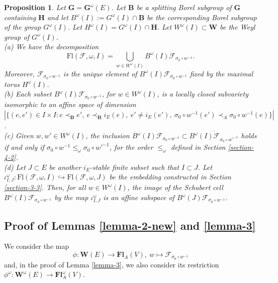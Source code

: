 \documentclass[12pt]{amsart}
\newtheorem{proposition}{Proposition}
\theoremstyle{definition}
\begin{document}
\begin{proposition}
\label{proposition-12-new}
Let $\mathbf{G}=\mathbf{G}^\omega(E)$. Let $\mathbf{B}$ be a splitting Borel subgroup of $\mathbf{G}$ containing $\mathbf{H}$ and let $B^\omega(I):=G^\omega(I)\cap\mathbf{B}$ be the corresponding Borel subgroup of the group $G^\omega(I)$. Let $H^\omega(I)=G^\omega(I)\cap \mathbf{H}$. Let $W^\omega(I)\subset\mathbf{W}$ be the Weyl group of $G^\omega(I)$. \\
{\rm (a)} We have the decomposition
\[\mathrm{Fl}(\mathcal{F},\omega,I)=\bigcup_{w\in W^\omega(I)}B^\omega(I)\mathcal{F}_{\sigma_0\circ w^{-1}}.\]
Moreover, $\mathcal{F}_{\sigma_0\circ w^{-1}}$ is the unique element of $B^\omega(I)\mathcal{F}_{\sigma_0\circ w^{-1}}$ fixed by the maximal torus $H^\omega(I)$. \\
{\rm (b)} Each subset $B^\omega(I)\mathcal{F}_{\sigma_0\circ w^{-1}}$, for $w\in W^\omega(I)$, is a locally closed subvariety isomorphic to an affine space of dimension $|\{(e,e')\in I\times I:e\prec_\mathbf{B}e',\ e\prec_\mathbf{B}i_E(e),\ e'\not=i_E(e'),\ \sigma_0\circ w^{-1}(e')\prec_A\sigma_0\circ w^{-1}(e)\}|$. \\
{\rm (c)} Given $w,w'\in W^\omega(I)$, the inclusion $B^\omega(I)\mathcal{F}_{\sigma_0\circ w^{-1}}\subset
\overline{B^\omega(I)\mathcal{F}_{\sigma_0\circ w'^{-1}}}$ holds if and only if $\sigma_0\circ w^{-1}\leq_\omega\sigma_0\circ w'^{-1}$, for the order $\leq_\omega$ defined in Section \ref{section-4-2}. \\
{\rm (d)} Let $J\subset E$ be another $i_E$-stable finite subset such that $I\subset J$. Let $\iota^\omega_{I,J}:\mathrm{Fl}(\mathcal{F},\omega,I)\hookrightarrow\mathrm{Fl}(\mathcal{F},\omega,J)$ be the embedding constructed in Section \ref{section-3-3}.
Then, for all $w\in W^\omega(I)$, the image of the Schubert cell $B^\omega(I)\mathcal{F}_{\sigma_0\circ w^{-1}}$ by the map $\iota^\omega_{I,J}$ is an affine subspace of $B^\omega(J)\mathcal{F}_{\sigma_0\circ w^{-1}}$.
\end{proposition}

\subsection{Proof of Lemmas \ref{lemma-2-new} and \ref{lemma-3}}

\label{section-5-3}

We consider the map
\[\phi:\mathbf{W}(E)\to\mathbf{Fl}_A(V),\ w\mapsto\mathcal{F}_{\sigma_0\circ w^{-1}}\]
and, in the proof of Lemma \ref{lemma-3}, we also consider its restriction $\phi^\omega:\mathbf{W}^\omega(E)\to\mathbf{Fl}_A^\omega(V)$.
\end{document}
